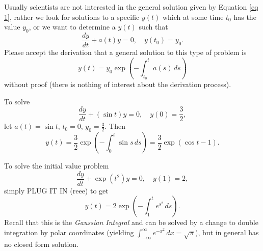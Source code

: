 Usually scientists are not interested in the general solution given by Equation \eqref{eq 1}, rather we look for solutions to a specific $y(t)$ which at some time $t_0$ has the value $y_0$, or we want to determine a $y(t)$ such that \[
    \frac{dy}{dt}+a(t)y=0, \quad y(t_0)=y_0.
\]
Please accept the derivation that a general solution to this type of problem is 
\begin{equation}\label{eq_2}
    y(t)=y_0\exp\left( -\int_{t_0}^{t} a(s) \, ds \right)  
\end{equation}
without proof (there is nothing of interest about the derivation process).
\begin{example}
    To solve \[
        \frac{dy}{dt}+(\sin t)y=0, \quad y(0)=\frac{3}{2},
    \]
    let  $a(t)=\sin t$, $t_0=0$, $y_0=\frac{3}{2}$. Then \[
        y(t)=\frac{3}{2}\exp\left( -\int_{0}^{t} \sin s \, ds \right)  =\frac{3}{2} \exp \left( \cos t - 1 \right).
    \]
\end{example}
\begin{example}
    To solve the initial value problem \[
        \frac{dy}{dt}+ \exp(t^2)y=0, \quad y(1)=2,
    \]
    simply PLUG IT IN (reee) to get \[
        y(t)=2\exp\left( -\int_{1}^{t} e^{s^2} \, ds \right).
    \]
    Recall that this is the \emph{Gaussian Integral} and can be solved by a change to double integration by polar coordinates (yielding $\int_{-\infty}^{\infty} e^{-x^2} \, dx = \sqrt{\pi}$), but in general has no closed form solution.
\end{example}



    
